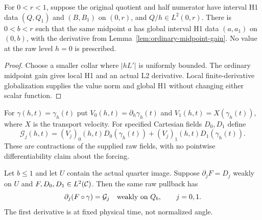 \begin{lemma}
\label{lem:ordinary-midpoint-collar}
\leanok
For $0<r<1$, suppose the original quotient and half numerator have interval
H1 data $(Q,Q_1)$ and $(B,B_1)$ on $(0,r)$, and $Q/h\in L^2(0,r)$.
There is $0<b<r$ such that the same midpoint $a$ has global interval H1
data $(a,a_1)$ on $(0,b)$, with the derivative from
Lemma~\ref{lem:ordinary-midpoint-gain}.
No value at the raw level $h=0$ is prescribed.
\end{lemma}

\begin{proof}
\leanok
Choose a smaller collar where $|hL'|$ is uniformly bounded.
The ordinary midpoint gain gives local H1 and an actual L2 derivative.
Local finite-derivative globalization supplies the value norm and global H1
without changing either scalar function.
\end{proof}

\begin{definition}
\label{def:quarter-forward-gradient}
\leanok
For $\gamma(h,t)=\gamma_h(t)$ put
$V_0(h,t)=\partial_h\gamma_h(t)$ and
$V_1(h,t)=X(\gamma_h(t))$, where $X$ is the transport velocity.
For specified Cartesian fields $D_0,D_1$ define
\[
 \mathcal G_j(h,t)=(V_j)_0(h,t)D_0(\gamma_h(t))
                    +(V_j)_1(h,t)D_1(\gamma_h(t)).
\]
These are contractions of the supplied raw fields, with no pointwise
differentiability claim about the forcing.
\end{definition}

\begin{lemma}
\label{lem:quarter-forward-weak}
\leanok
Let $b\le1$ and let $U$ contain the actual quarter image.
Suppose $\partial_jF=D_j$ weakly on $U$ and
$F,D_0,D_1\in L^2(\mathcal{C})$.
Then the same raw pullback has
\[
 \partial_j(F\circ\gamma)=\mathcal G_j
 \quad\hbox{weakly on }Q_b,\qquad j=0,1 .
\]
The first derivative is at fixed physical time, not normalized angle.
\end{lemma}

